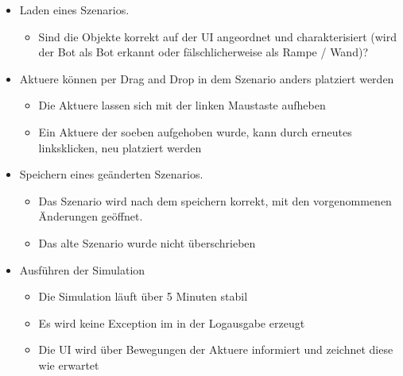 \begin{itemize}
\item Laden eines Szenarios.
	\begin{itemize}
	\item Sind die Objekte korrekt auf der UI angeordnet und charakterisiert (wird der Bot als Bot erkannt oder fälschlicherweise als Rampe / Wand)?
	\end{itemize}	
	
\item Aktuere können per Drag and Drop in dem Szenario anders platziert werden
	\begin{itemize}
	\item Die Aktuere lassen sich mit der linken Maustaste aufheben
	\item Ein Aktuere der soeben aufgehoben wurde, kann durch erneutes linksklicken, neu platziert werden
	\end{itemize}	
	


\item Speichern eines geänderten Szenarios.
	\begin{itemize}
	\item Das Szenario wird nach dem speichern korrekt, mit den vorgenommenen Änderungen geöffnet.
	\item Das alte Szenario wurde nicht überschrieben
	\end{itemize}	
	
\item Ausführen der Simulation
	\begin{itemize}
	\item Die Simulation läuft über 5 Minuten stabil
	\item Es wird keine Exception im in der Logausgabe erzeugt
	\item Die UI wird über Bewegungen der Aktuere informiert und zeichnet diese wie erwartet
	\end{itemize}	

\end{itemize}